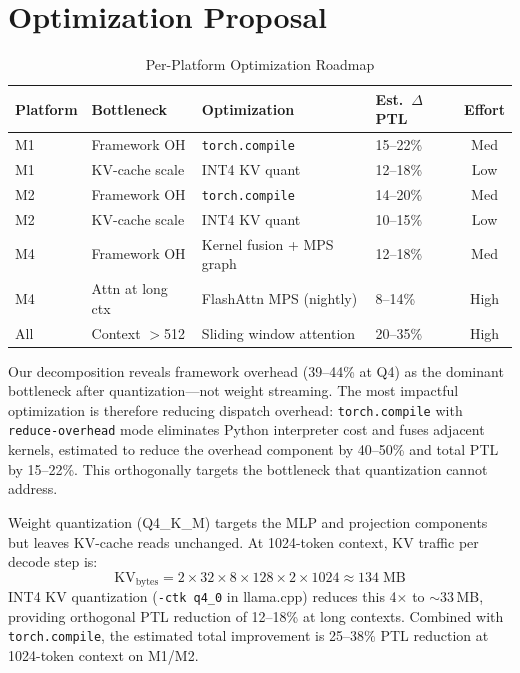 \documentclass[conference]{IEEEtran}
\begin{document}
\section{Optimization Proposal}

\begin{table}[t]
\caption{Per-Platform Optimization Roadmap}
\label{tab:roadmap}
\centering
\scriptsize
\begin{tabular}{llllc}
\toprule
\textbf{Platform} & \textbf{Bottleneck} & \textbf{Optimization} & \textbf{Est.\ $\Delta$PTL} & \textbf{Effort} \\
\midrule
M1 & Framework OH   & \texttt{torch.compile}        & 15--22\% & Med \\
M1 & KV-cache scale & INT4 KV quant                 & 12--18\% & Low \\
M2 & Framework OH   & \texttt{torch.compile}        & 14--20\% & Med \\
M2 & KV-cache scale & INT4 KV quant                 & 10--15\% & Low \\
M4 & Framework OH   & Kernel fusion + MPS graph      & 12--18\% & Med \\
M4 & Attn at long ctx & FlashAttn MPS (nightly)      & 8--14\%  & High \\
All & Context $>$512 & Sliding window attention       & 20--35\% & High \\
\bottomrule
\end{tabular}
\end{table}

Our decomposition reveals framework overhead (39--44\% at Q4) as the dominant bottleneck after quantization---not weight streaming. The most impactful optimization is therefore reducing dispatch overhead: \texttt{torch.compile} with \texttt{reduce-overhead} mode eliminates Python interpreter cost and fuses adjacent kernels, estimated to reduce the overhead component by 40--50\% and total PTL by 15--22\%. This orthogonally targets the bottleneck that quantization cannot address.

Weight quantization (Q4\_K\_M) targets the MLP and projection components but leaves KV-cache reads unchanged. At 1024-token context, KV traffic per decode step is:
\begin{equation}
  \text{KV}_{\text{bytes}} = 2 \times 32 \times 8 \times 128 \times 2 \times 1024 \approx 134\;\text{MB}
\end{equation}
INT4 KV quantization (\texttt{-ctk q4\_0} in llama.cpp) reduces this 4$\times$ to ${\sim}$33\,MB, providing orthogonal PTL reduction of 12--18\% at long contexts. Combined with \texttt{torch.compile}, the estimated total improvement is 25--38\% PTL reduction at 1024-token context on M1/M2.
\end{document}
